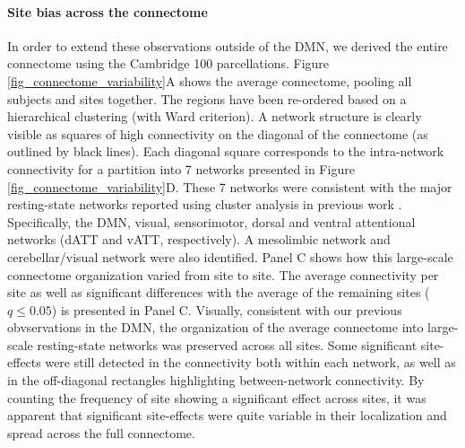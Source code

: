 \documentclass[authoryear]{elsarticle}
\begin{document}
\paragraph{Site bias across the connectome} In order to extend these observations outside of the DMN, we derived the entire connectome using the Cambridge 100 parcellations. Figure \ref{fig_connectome_variability}A shows the average connectome, pooling all subjects and sites together. The regions have been re-ordered based on a hierarchical clustering (with Ward criterion). A network structure is clearly visible as squares of high connectivity on the diagonal of the connectome (as outlined by black lines). Each diagonal square corresponds to the intra-network connectivity for a partition into 7 networks presented in Figure \ref{fig_connectome_variability}D. These 7 networks were consistent with the major resting-state networks reported using cluster analysis in previous work \citep[e.g.][]{Heuvel2008, Bellec2010, Yeo2011, Power2011}. Specifically, the DMN, visual, sensorimotor, dorsal and ventral attentional networks (dATT and vATT, respectively). A mesolimbic network and cerebellar/visual network were also identified. Panel C shows how this large-scale connectome organization varied from site to site. The average connectivity per site as well as significant differences with the average of the remaining sites ($q\leq 0.05$) is presented in Panel C. Visually, consistent with our previous obvservations in the DMN, the organization of the average connectome into large-scale resting-state networks was preserved across all sites. Some significant site-effects were still detected in the connectivity both within each network, as well as in the off-diagonal rectangles highlighting between-network connectivity. By counting the frequency of site showing a significant effect across sites, it was apparent that significant site-effects were quite variable in their localization and spread across the full connectome. 
\end{document}
